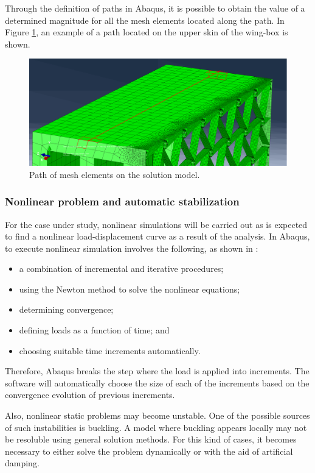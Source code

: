   Through the definition of paths in Abaqus, it is possible to obtain the value of a determined magnitude for all the mesh elements located along the path. In Figure \ref{fig:pathUpper}, an example of a path located on the upper skin of the wing-box is shown.

  \begin{figure}[!htpb]
    \centering
    \includegraphics[width=0.8 \textwidth]{../figures/result-model/pathUpper}
    \caption[Path of mesh elements on the solution model]{Path of mesh elements on the solution model.}\label{fig:pathUpper}
  \end{figure}

\subsubsection{Nonlinear problem and automatic stabilization} %
  
  For the case under study, nonlinear simulations will be carried out as is expected to find a nonlinear load-displacement curve as a result of the analysis. In Abaqus, to execute nonlinear simulation involves the following, as shown in \cite{Abaqus}:

  \begin{itemize}
    \item a combination of incremental and iterative procedures;
    \item using the Newton method to solve the nonlinear equations;
    \item determining convergence;
    \item defining loads as a function of time; and
    \item choosing suitable time increments automatically.
  \end{itemize}

  Therefore, Abaqus breaks the step where the load is applied into increments. The software will automatically choose the size of each of the increments based on the convergence evolution of previous increments.

  Also, nonlinear static problems may become unstable. One of the possible sources of such instabilities is buckling. A model where buckling appears locally may not be resoluble using general solution methods. For this kind of cases, it becomes necessary to either solve the problem dynamically or with the aid of artificial damping.

